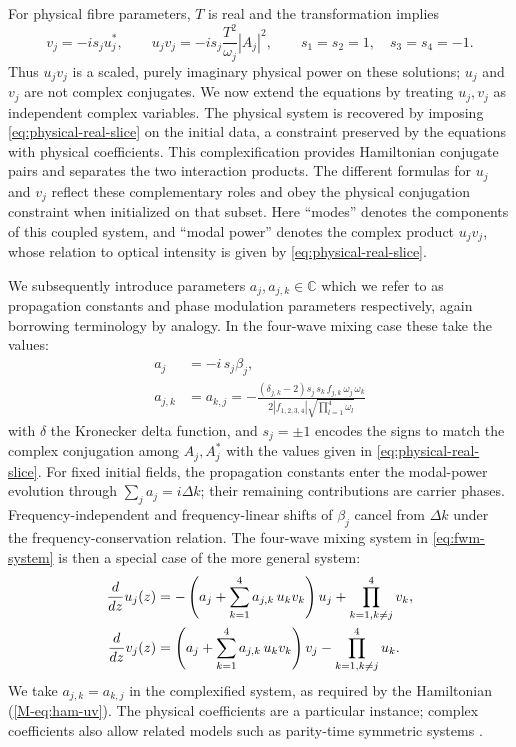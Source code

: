 \documentclass[11pt,a4paper]{article}
\newcommand{\externaleqref}[1]{\textup{(\ref*{#1})}}
\begin{document}
For physical fibre parameters, $T$ is real and the transformation implies
\begin{equation}
v_j=-is_j u_j^*,\qquad
u_jv_j=-is_j\frac{T^2}{\omega_j}|A_j|^2,
\qquad s_1=s_2=1,\quad s_3=s_4=-1.
\label{eq:physical-real-slice}
\end{equation}
Thus $u_jv_j$ is a scaled, purely imaginary physical power on these solutions; $u_j$ and $v_j$ are not complex conjugates.
We now extend the equations by treating $u_j,v_j$ as independent complex variables.
The physical system is recovered by imposing \eqref{eq:physical-real-slice} on the initial data, a constraint preserved by the equations with physical coefficients.
This complexification provides Hamiltonian conjugate pairs and separates the two interaction products.
The different formulas for $u_j$ and $v_j$ reflect these complementary roles and obey the physical conjugation constraint when initialized on that subset.
Here ``modes'' denotes the components of this coupled system, and ``modal power'' denotes the complex product $u_jv_j$, whose relation to optical intensity is given by \eqref{eq:physical-real-slice}.

We subsequently introduce parameters $a_j, a_{j,k} \in \mathbb{C}$ which we refer to as propagation constants and phase modulation parameters respectively, again borrowing terminology by analogy.
In the four-wave mixing case these take the values:
\begin{align}
{a}_{j} &= - i\, s_j {\beta}_{j}, \\
{a}_{j,k} &= {a}_{k,j} = - \frac{\left(\delta_{j, k} - 2\right) s_j\, s_k\, {f}_{j,k}\, {\omega}_{j}\, {\omega}_{k}}{2 \left|{{f}_{1,2,3,4}}\right| \sqrt{\prod_{l=1}^{4} {\omega}_{l}}}
\end{align}
with $\delta$ the Kronecker delta function, and $s_j=\pm1$ encodes the signs to match the complex conjugation among $A_j, A^*_j$ with the values given in \eqref{eq:physical-real-slice}.
For fixed initial fields, the propagation constants enter the modal-power evolution through $\sum_j a_j=i\Delta k$; their remaining contributions are carrier phases.
Frequency-independent and frequency-linear shifts of $\beta_j$ cancel from $\Delta k$ under the frequency-conservation relation.
The four-wave mixing system in \eqref{eq:fwm-system} is then a special case of the more general system:
\begin{align}
\frac{d}{d z} u_j{\left(z \right)} &= - \left({a}_{j} + \sum_{k=1}^{4} {a}_{j,k}\,u_k v_k \right) u_j + \prod\limits_{k=1, k \ne j}^{4} v_k, \notag \\
\frac{d}{d z} v_j{\left(z \right)} &= \left({a}_{j} + \sum_{k=1}^{4} {a}_{j,k}\,u_k v_k \right) v_j - \prod\limits_{k=1, k \ne j}^{4} u_k. \label{eq:uv-system}
\end{align}
We take $a_{j,k}=a_{k,j}$ in the complexified system, as required by the Hamiltonian \externaleqref{M-eq:ham-uv}.
The physical coefficients are a particular instance; complex coefficients also allow related models such as parity-time symmetric systems \cite{heskethGeneralComplexEnvelope2015,sarmaContinuousDiscreteSchrodinger2014}.
\end{document}
